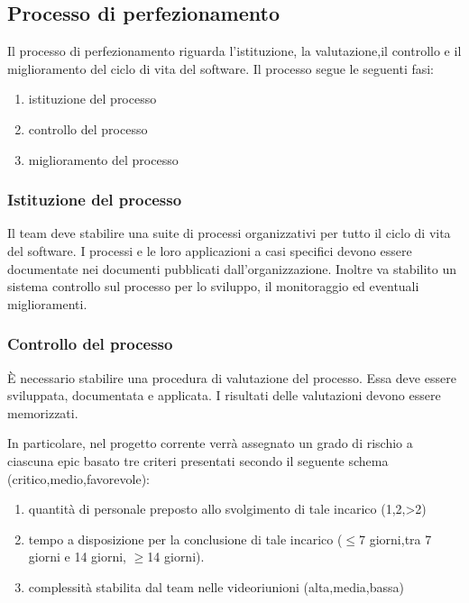 \subsection{Processo di perfezionamento}
Il processo di perfezionamento riguarda l'istituzione, la valutazione,il controllo e il miglioramento del ciclo di vita del software. Il processo segue le seguenti fasi:

\begin{enumerate}
    \item istituzione del processo
    \item controllo del processo
    \item miglioramento del processo
\end{enumerate}

\subsubsection{Istituzione del processo}

\myparagraph{} Il team deve stabilire una suite di processi organizzativi per tutto il ciclo di vita del software. I processi e le loro applicazioni a casi specifici devono essere documentate nei documenti pubblicati dall'organizzazione. Inoltre va stabilito un sistema controllo sul processo per lo sviluppo, il monitoraggio ed eventuali miglioramenti.

\subsubsection{Controllo del processo}

\myparagraph{}\`E necessario stabilire una procedura di valutazione del processo. Essa deve essere sviluppata, documentata e applicata. I risultati delle valutazioni devono essere memorizzati.

In particolare, nel progetto corrente verrà assegnato un grado di rischio a ciascuna epic basato tre criteri presentati secondo il seguente schema (critico,medio,favorevole):

\begin{enumerate}
    \item quantità di personale preposto allo svolgimento di tale incarico (1,2,>2)
    \item tempo a disposizione per la conclusione di tale incarico ($\leq$7 giorni,tra 7 giorni e 14 giorni, $\geq$14 giorni).
    \item complessità stabilita dal team nelle videoriunioni (alta,media,bassa)
\end{enumerate}


